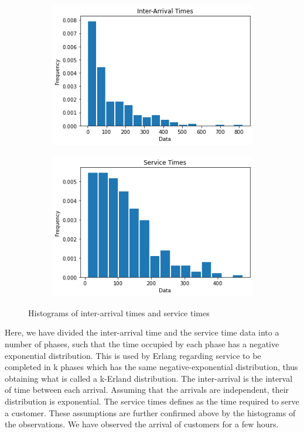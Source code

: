 \documentclass{article}
\begin{document}
\begin{figure}[h]
    \centering
    \begin{subfigure}[b]{0.45\textwidth}
        \centering
        \includegraphics[width=\textwidth]{fig1.png}
        \caption{}
        \label{fig:img1}
    \end{subfigure}
    \hfill
    \begin{subfigure}[b]{0.45\textwidth}
        \centering
        \includegraphics[width=\textwidth]{fig2.png}
        \caption{}
        \label{fig:img2}
    \end{subfigure}

    \caption{Histograms of inter-arrival times and service times}
    \label{fig:two-figs}
\end{figure}

Here, we have divided the inter-arrival time and the service time data into a number of phases, such that the time occupied by each phase has a negative exponential distribution. This is used by Erlang regarding service to be completed in k phases which has the same negative-exponential distribution, thus obtaining what is called a k-Erland distribution.
The inter-arrival is the interval of time between each arrival. Assuming that the arrivals are independent, their distribution is exponential.
The service times defines as the time required to serve a customer. 
These assumptions are further confirmed above by the histograms of the observations. We have observed the arrival of customers for a few hours.
\end{document}
